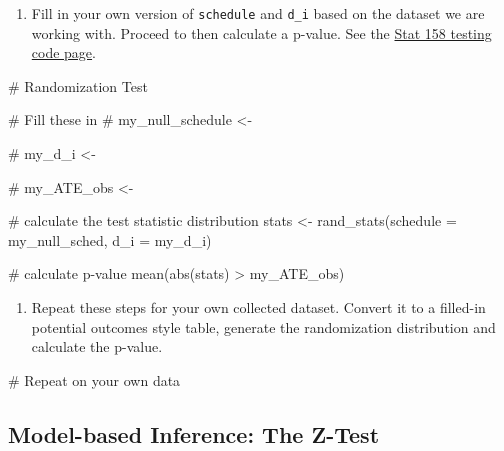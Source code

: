 \documentclass[
  letterpaper,
  DIV=11,
  numbers=noendperiod]{scrartcl}
\newenvironment{Shaded}{\begin{snugshade}}{\end{snugshade}}
\newcommand{\AttributeTok}[1]{\textcolor[rgb]{0.40,0.45,0.13}{#1}}
\newcommand{\CommentTok}[1]{\textcolor[rgb]{0.37,0.37,0.37}{#1}}
\newcommand{\FunctionTok}[1]{\textcolor[rgb]{0.28,0.35,0.67}{#1}}
\newcommand{\NormalTok}[1]{\textcolor[rgb]{0.00,0.23,0.31}{#1}}
\newcommand{\OtherTok}[1]{\textcolor[rgb]{0.00,0.23,0.31}{#1}}
\newcommand{\SpecialCharTok}[1]{\textcolor[rgb]{0.37,0.37,0.37}{#1}}
\providecommand{\tightlist}{%
  \setlength{\itemsep}{0pt}\setlength{\parskip}{0pt}}
\begin{document}
\begin{enumerate}
\def\labelenumi{\arabic{enumi}.}
\setcounter{enumi}{6}
\tightlist
\item
  Fill in your own version of \texttt{schedule} and \texttt{d\_i} based
  on the dataset we are working with. Proceed to then calculate a
  p-value. See the
  \href{https://stat158.berkeley.edu/spring-2026/05-testing/code.html}{Stat
  158 testing code page}.
\end{enumerate}

\begin{Shaded}
\begin{Highlighting}[]
\CommentTok{\# Randomization Test }

\CommentTok{\# Fill these in}
\CommentTok{\# my\_null\_schedule \textless{}{-} }
  
\CommentTok{\# my\_d\_i \textless{}{-}}
  
\CommentTok{\# my\_ATE\_obs \textless{}{-}}
  
\CommentTok{\# calculate the test statistic distribution  }
\NormalTok{stats }\OtherTok{\textless{}{-}} \FunctionTok{rand\_stats}\NormalTok{(}\AttributeTok{schedule =}\NormalTok{ my\_null\_sched, }\AttributeTok{d\_i =}\NormalTok{ my\_d\_i)}

\CommentTok{\# calculate p{-}value}
\FunctionTok{mean}\NormalTok{(}\FunctionTok{abs}\NormalTok{(stats) }\SpecialCharTok{\textgreater{}}\NormalTok{ my\_ATE\_obs)}
\end{Highlighting}
\end{Shaded}

\begin{enumerate}
\def\labelenumi{\arabic{enumi}.}
\setcounter{enumi}{7}
\tightlist
\item
  Repeat these steps for your own collected dataset. Convert it to a
  filled-in potential outcomes style table, generate the randomization
  distribution and calculate the p-value.
\end{enumerate}

\begin{Shaded}
\begin{Highlighting}[]
\CommentTok{\# Repeat on your own data }
\end{Highlighting}
\end{Shaded}

\subsection{Model-based Inference: The
Z-Test}\label{model-based-inference-the-z-test}
\end{document}
